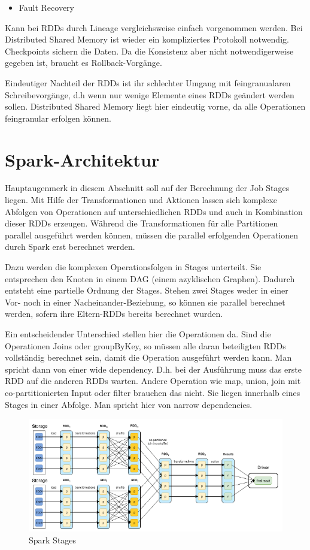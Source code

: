 \begin{itemize}
\item Fault Recovery
\end{itemize}
Kann bei RDDs durch Lineage vergleichsweise einfach vorgenommen werden.
Bei Distributed Shared Memory ist wieder ein kompliziertes Protokoll
notwendig. Checkpoints sichern die Daten. Da die Konsistenz aber nicht
notwendigerweise gegeben ist, braucht es Rollback-Vorgänge. 

Eindeutiger Nachteil der RDDs ist ihr schlechter Umgang mit
feingranualaren Schreibevorgänge, d.h wenn nur wenige Elemente eines
RDDs geändert werden sollen. Distributed Shared Memory liegt hier
eindeutig vorne, da alle Operationen feingranular erfolgen können.

\section[Spark{}-Architektur]{\rmfamily
Spark-Architektur}
Hauptaugenmerk in diesem Abschnitt soll auf der Berechnung der Job
Stages liegen. Mit Hilfe der Transformationen und Aktionen lassen sich
komplexe Abfolgen von Operationen auf unterschiedlichen RDDs und auch
in Kombination dieser RDDs erzeugen. Während die Transformationen für
alle Partitionen parallel ausgeführt werden können, müssen die parallel
erfolgenden Operationen durch Spark erst berechnet werden.

Dazu werden die komplexen Operationsfolgen in Stages unterteilt. Sie
entsprechen den Knoten in einem DAG (einem azyklischen Graphen).
Dadurch entsteht eine partielle Ordnung der Stages. Stehen zwei Stages
weder in einer Vor- noch in einer Nacheinander-Beziehung, so können sie
parallel berechnet werden, sofern ihre Eltern-RDDs bereits berechnet
wurden. 

Ein entscheidender Unterschied stellen hier die Operationen da. Sind die
Operationen Joins oder groupByKey, so müssen alle daran beteiligten
RDDs vollständig berechnet sein, damit die Operation ausgeführt werden
kann. Man spricht dann von einer wide dependency. D.h. bei der
Ausführung muss das erste RDD auf die anderen RDDs warten. Andere
Operation wie map, union, join mit co-partitionierten Input oder filter
brauchen das nicht. Sie liegen innerhalb eines Stages in einer Abfolge.
Man spricht hier von narrow dependencies.

\begin{figure}
\centering
\includegraphics[width=\textwidth]{bilder/Seminartext-img2.png}
\caption{Spark Stages}
\end{figure}

